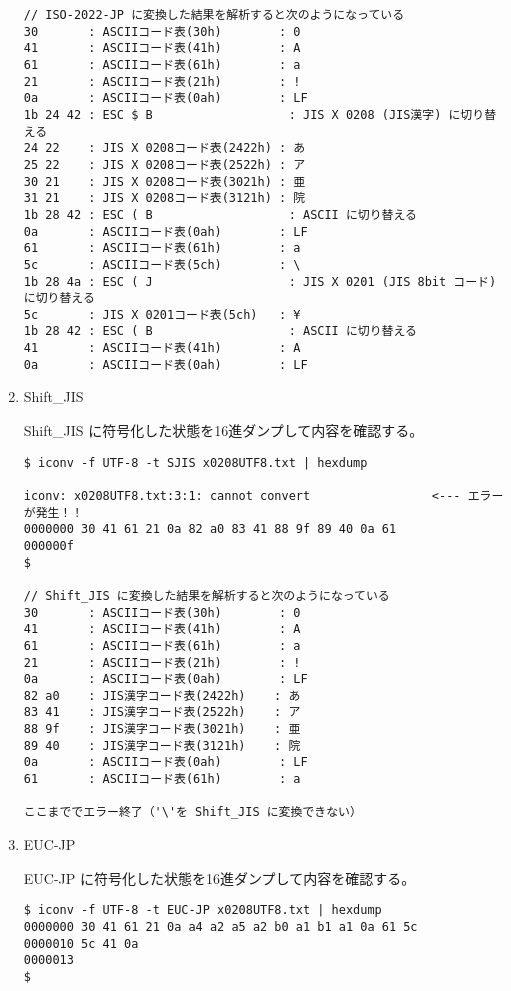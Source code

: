 \documentclass[a4j,dvipdfmx]{jarticle}
\begin{document}
\begin{enumerate}
\begin{lstlisting}
// ISO-2022-JP に変換した結果を解析すると次のようになっている
30       : ASCIIコード表(30h)        : 0
41       : ASCIIコード表(41h)        : A
61       : ASCIIコード表(61h)        : a
21       : ASCIIコード表(21h)        : !
0a       : ASCIIコード表(0ah)        : LF
1b 24 42 : ESC $ B                   : JIS X 0208 (JIS漢字) に切り替える
24 22    : JIS X 0208コード表(2422h) : あ
25 22    : JIS X 0208コード表(2522h) : ア
30 21    : JIS X 0208コード表(3021h) : 亜
31 21    : JIS X 0208コード表(3121h) : 院
1b 28 42 : ESC ( B                   : ASCII に切り替える
0a       : ASCIIコード表(0ah)        : LF
61       : ASCIIコード表(61h)        : a
5c       : ASCIIコード表(5ch)        : \
1b 28 4a : ESC ( J                   : JIS X 0201 (JIS 8bit コード) に切り替える
5c       : JIS X 0201コード表(5ch)   : ¥
1b 28 42 : ESC ( B                   : ASCII に切り替える
41       : ASCIIコード表(41h)        : A
0a       : ASCIIコード表(0ah)        : LF
\end{lstlisting}

\item Shift\_JIS

Shift\_JIS に符号化した状態を16進ダンプして内容を確認する。

\begin{lstlisting}
$ iconv -f UTF-8 -t SJIS x0208UTF8.txt | hexdump

iconv: x0208UTF8.txt:3:1: cannot convert                 <--- エラーが発生！！
0000000 30 41 61 21 0a 82 a0 83 41 88 9f 89 40 0a 61   
000000f
$

// Shift_JIS に変換した結果を解析すると次のようになっている
30       : ASCIIコード表(30h)        : 0
41       : ASCIIコード表(41h)        : A
61       : ASCIIコード表(61h)        : a
21       : ASCIIコード表(21h)        : !
0a       : ASCIIコード表(0ah)        : LF
82 a0    : JIS漢字コード表(2422h)    : あ
83 41    : JIS漢字コード表(2522h)    : ア
88 9f    : JIS漢字コード表(3021h)    : 亜
89 40    : JIS漢字コード表(3121h)    : 院
0a       : ASCIIコード表(0ah)        : LF
61       : ASCIIコード表(61h)        : a

ここまででエラー終了（'\'を Shift_JIS に変換できない）
\end{lstlisting}

\newpage

\item EUC-JP

EUC-JP に符号化した状態を16進ダンプして内容を確認する。

\begin{lstlisting}
$ iconv -f UTF-8 -t EUC-JP x0208UTF8.txt | hexdump
0000000 30 41 61 21 0a a4 a2 a5 a2 b0 a1 b1 a1 0a 61 5c
0000010 5c 41 0a                                       
0000013
$


\end{lstlisting}
\end{enumerate}
\end{document}
